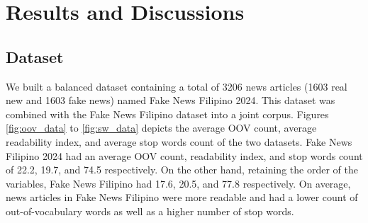 \chapter{Results and Discussions}

\section{Dataset}
We built a balanced dataset containing a total of 3206 news articles (1603 real new and 1603 fake news) named Fake News Filipino 2024. This dataset was combined with the Fake News Filipino \cite{fake-news-filipino} dataset into a joint corpus. Figures \ref{fig:oov_data} to \ref{fig:sw_data} depicts the average OOV count, average readability index, and average stop words count of the two datasets. Fake News Filipino 2024 had an average OOV count, readability index, and stop words count of 22.2, 19.7, and 74.5 respectively. On the other hand, retaining the order of the variables, Fake News Filipino had 17.6, 20.5, and 77.8 respectively. On average, news articles in Fake News Filipino were more readable and had a lower count of out-of-vocabulary words as well as a higher number of stop words.

